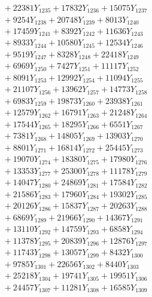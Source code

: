 \documentclass[a4paper,10pt]{article}
\begin{document}
{\begin{align}
&\;  + 22381 Y_{1235} + 17832 Y_{1236} + 15075 Y_{1237} \\[0.3ex]
&\;  + 9254 Y_{1238} + 20748 Y_{1239} + 8013 Y_{1240} \\[0.3ex]
&\;  + 17459 Y_{1241} + 8392 Y_{1242} + 11636 Y_{1243} \\[0.3ex]
&\;  + 8933 Y_{1244} + 10580 Y_{1245} + 12534 Y_{1246} \\[0.3ex]
&\;  + 9519 Y_{1247} + 8328 Y_{1248} + 22418 Y_{1249} \\[0.3ex]
&\;  + 6969 Y_{1250} + 7427 Y_{1251} + 11117 Y_{1252} \\[0.3ex]
&\;  + 8091 Y_{1253} + 12992 Y_{1254} + 11094 Y_{1255} \\[0.3ex]
&\;  + 21107 Y_{1256} + 13962 Y_{1257} + 14773 Y_{1258} \\[0.5ex]\allowbreak
&\;  + 6983 Y_{1259} + 19873 Y_{1260} + 23938 Y_{1261} \\[0.3ex]
&\;  + 12579 Y_{1262} + 16791 Y_{1263} + 21248 Y_{1264} \\[0.3ex]
&\;  + 17544 Y_{1265} + 18295 Y_{1266} + 6551 Y_{1267} \\[0.3ex]
&\;  + 7381 Y_{1268} + 14805 Y_{1269} + 13903 Y_{1270} \\[0.3ex]
&\;  + 8801 Y_{1271} + 16814 Y_{1272} + 25445 Y_{1273} \\[0.3ex]
&\;  + 19070 Y_{1274} + 18380 Y_{1275} + 17980 Y_{1276} \\[0.3ex]
&\;  + 13353 Y_{1277} + 25300 Y_{1278} + 11178 Y_{1279} \\[0.3ex]
&\;  + 14047 Y_{1280} + 24869 Y_{1281} + 17584 Y_{1282} \\[0.3ex]
&\;  + 21586 Y_{1283} + 17960 Y_{1284} + 19302 Y_{1285} \\[0.3ex]
&\;  + 20126 Y_{1286} + 15837 Y_{1287} + 20263 Y_{1288} \\[0.5ex]\allowbreak
&\;  + 6869 Y_{1289} + 21966 Y_{1290} + 14367 Y_{1291} \\[0.3ex]
&\;  + 13110 Y_{1292} + 14759 Y_{1293} + 6858 Y_{1294} \\[0.3ex]
&\;  + 11378 Y_{1295} + 20839 Y_{1296} + 12876 Y_{1297} \\[0.3ex]
&\;  + 11743 Y_{1298} + 13057 Y_{1299} + 8432 Y_{1300} \\[0.3ex]
&\;  + 9785 Y_{1301} + 22656 Y_{1302} + 8440 Y_{1303} \\[0.3ex]
&\;  + 25218 Y_{1304} + 19741 Y_{1305} + 19951 Y_{1306} \\[0.3ex]
&\;  + 24457 Y_{1307} + 11281 Y_{1308} + 16585 Y_{1309} \\[0.3ex]

\end{align}}
\end{document}
